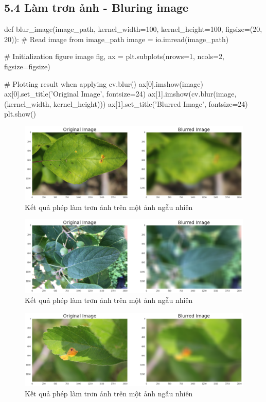 \documentclass{article}
\begin{document}
	\subsection{5.4 Làm trơn ảnh - Bluring image}
	\begin{python}
		def blur_image(image_path, kernel_width=100, kernel_height=100, figsize=(20, 20)):
			# Read image from image_path
			image = io.imread(image_path)
			
			# Initialization figure image
			fig, ax = plt.subplots(nrows=1, ncols=2, figsize=figsize)
			
			# Plotting result when applying cv.blur()
			ax[0].imshow(image)
			ax[0].set_title('Original Image', fontsize=24)
			ax[1].imshow(cv.blur(image, (kernel_width, kernel_height)))
			ax[1].set_title('Blurred Image', fontsize=24)
			plt.show()
	\end{python}
	\begin{figure}[H]
		\centering
		\includegraphics[width=1\linewidth]{images/blur_1.png}
		\caption{Kết quả phép làm trơn ảnh trên một ảnh ngẫu nhiên}
		\label{fig:writing-thesis}
	\end{figure}
	\begin{figure}[H]
		\centering
		\includegraphics[width=1\linewidth]{images/blur_2.png}
		\caption{Kết quả phép làm trơn ảnh trên một ảnh ngẫu nhiên}
		\label{fig:writing-thesis}
	\end{figure}
	\begin{figure}[H]
		\centering
		\includegraphics[width=1\linewidth]{images/blur_3.png}
		\caption{Kết quả phép làm trơn ảnh trên một ảnh ngẫu nhiên}
		\label{fig:writing-thesis}
	\end{figure}
\end{document}
